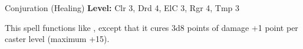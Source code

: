 {Conjuration (Healing)}
{
	\textbf{Level:}
	Clr 3, Drd 4, ElC 3, Rgr 4, Tmp 3\\
}
{
	This spell functions like , except that it cures 3d8 points of damage +1 point per caster level (maximum +15).

}
